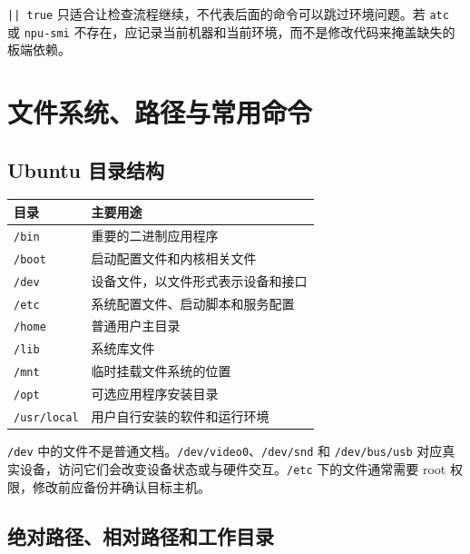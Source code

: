 \passthrough{\lstinline!|| true!}
只适合让检查流程继续，不代表后面的命令可以跳过环境问题。若
\passthrough{\lstinline!atc!} 或 \passthrough{\lstinline!npu-smi!}
不存在，应记录当前机器和当前环境，而不是修改代码来掩盖缺失的板端依赖。

\section{文件系统、路径与常用命令}\label{ux6587ux4ef6ux7cfbux7edfux8defux5f84ux4e0eux5e38ux7528ux547dux4ee4}

\subsection{Ubuntu 目录结构}\label{ubuntu-ux76eeux5f55ux7ed3ux6784}

\begin{longtable}[]{@{}ll@{}}
\toprule\noalign{}
目录 & 主要用途 \\
\midrule\noalign{}
\endhead
\bottomrule\noalign{}
\endlastfoot
\passthrough{\lstinline!/bin!} & 重要的二进制应用程序 \\
\passthrough{\lstinline!/boot!} & 启动配置文件和内核相关文件 \\
\passthrough{\lstinline!/dev!} & 设备文件，以文件形式表示设备和接口 \\
\passthrough{\lstinline!/etc!} & 系统配置文件、启动脚本和服务配置 \\
\passthrough{\lstinline!/home!} & 普通用户主目录 \\
\passthrough{\lstinline!/lib!} & 系统库文件 \\
\passthrough{\lstinline!/mnt!} & 临时挂载文件系统的位置 \\
\passthrough{\lstinline!/opt!} & 可选应用程序安装目录 \\
\passthrough{\lstinline!/usr/local!} & 用户自行安装的软件和运行环境 \\
\end{longtable}

\passthrough{\lstinline!/dev!}
中的文件不是普通文档。\passthrough{\lstinline!/dev/video0!}、\passthrough{\lstinline!/dev/snd!}
和 \passthrough{\lstinline!/dev/bus/usb!}
对应真实设备，访问它们会改变设备状态或与硬件交互。\passthrough{\lstinline!/etc!}
下的文件通常需要 root 权限，修改前应备份并确认目标主机。

\subsection{绝对路径、相对路径和工作目录}\label{ux7eddux5bf9ux8defux5f84ux76f8ux5bf9ux8defux5f84ux548cux5de5ux4f5cux76eeux5f55}

